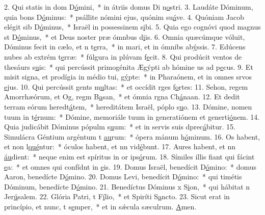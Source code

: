 2. Qui statis in dom D\uline{ó}mini,~* in átriis domus Di n\uline{o}stri.
3. Laudáte Dóminum, quia bons D\uline{ó}minus:~* psállite nómini ejus, quónim su\uline{á}ve.
4. Quóniam Jacob elégit sib D\uline{ó}minus,~* Israël in possessinem s\uline{i}bi.
5. Quia ego cognóvi quod magnus st D\uline{ó}minus,~* et Deus noster præ ómnbus d\uline{i}is.
6. Omnia quæcúmque vóluit, Dóminus fecit in cælo, et n t\uline{e}rra,~* in mari, et in ómnibs ab\uline{ý}ssis.
7. Edúcens nubes ab extrém t\uline{e}rræ:~* fúlgura in plúvam f\uline{e}cit.
8. Qui prodúcit ventos de thesáurs s\uline{u}is:~* qui percússit primogénita Ægýpti ab hómine us ad p\uline{e}cus.
9. Et misit signa, et prodígia in médio tui, g\uline{ý}pte:~* in Pharaónem, et in omnes srvos \uline{e}jus.
10. Qui percússit gents m\uline{u}ltas:~* et occídit rges f\uline{o}rtes:
11. Sehon, regem Amorrhæórum, et Og, regm B\uline{a}san,~* et ómnia rgna Ch\uline{á}naan.
12. Et dedit terram eórum heredt\uline{á}tem,~* hereditátem Israël, póplo s\uline{u}o.
13. Dómine, nomen tuum in t\uline{é}rnum:~* Dómine, memoriále tuum in generatiónem et generti\uline{ó}nem.
14. Quia judicábit Dóminus pópulm s\uline{u}um:~* et in servis suis dprec\uline{á}bitur.
15. Simulácra Géntium argéntum t \uline{au}rum:~* ópera mánum h\uline{ó}minum.
16. Os habent, et non l\uline{qué}ntur:~* óculos habent, et nn vid\uline{é}bunt.
17. Aures habent, et nn \uline{áu}dient:~* neque enim est spíritus in or ips\uline{ó}rum.
18. Símiles illis fiant qui fácint \uline{e}a:~* et omnes qui confídnt in \uline{e}is.
19. Domus Israël, benedícit D\uline{ó}mino:~* domus Aaron, benedícte D\uline{ó}mino.
20. Domus Levi, benedícit D\uline{ó}mino:~* qui timétis Dóminum, benedícte D\uline{ó}mino.
21. Benedíctus Dóminus x S\uline{i}on,~* qui hábitat n Jer\uline{ú}salem.
22. Glória Patri, t F\uline{í}lio,~* et Spiríti S\uline{a}ncto.
23. Sicut erat in princípio, et nunc, t s\uline{e}mper,~* et in sǽcula sæculrum. \uline{A}men.
